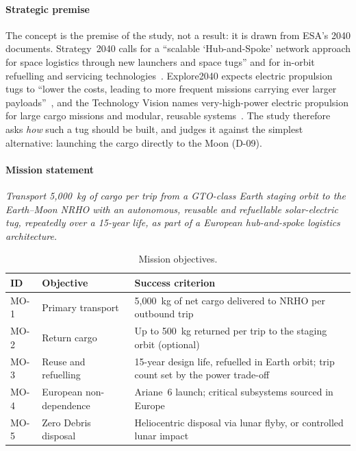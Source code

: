 \documentclass[11pt,a4paper]{article}
\newcommand{\id}[1]{#1}
\begin{document}
\paragraph{Strategic premise} The concept is the premise of the study, not a result: it is drawn from ESA's 2040 documents. Strategy~2040 calls for a ``scalable `Hub-and-Spoke' network approach for space logistics through new launchers and space tugs'' and for in-orbit refuelling and servicing technologies~\cite[p.~45]{strategy2040}. Explore2040 expects electric propulsion tugs to ``lower the costs, leading to more frequent missions carrying ever larger payloads''~\cite[p.~16]{explore2040}, and the Technology Vision names very-high-power electric propulsion for large cargo missions and modular, reusable systems~\cite[pp.~45, 50]{techvision}. The study therefore asks \emph{how} such a tug should be built, and judges it against the simplest alternative: launching the cargo directly to the Moon (\id{D-09}).

\paragraph{Mission statement} \emph{Transport 5,000~kg of cargo per trip from a GTO-class Earth staging orbit to the Earth--Moon NRHO with an autonomous, reusable and refuellable solar-electric tug, repeatedly over a 15-year life, as part of a European hub-and-spoke logistics architecture.}

\begin{table}[htbp]\centering\small
\caption{Mission objectives.}\label{tab:mo}
\begin{tabularx}{\linewidth}{@{}P{1.1cm}P{3.2cm}L@{}}
\toprule
ID & Objective & Success criterion \\
\midrule
\id{MO-1} & Primary transport & 5,000~kg of net cargo delivered to NRHO per outbound trip \\
\id{MO-2} & Return cargo & Up to 500~kg returned per trip to the staging orbit (optional) \\
\id{MO-3} & Reuse and refuelling & 15-year design life, refuelled in Earth orbit; trip count set by the power trade-off \\
\id{MO-4} & European non-dependence & Ariane~6 launch; critical subsystems sourced in Europe \\
\id{MO-5} & Zero Debris disposal & Heliocentric disposal via lunar flyby, or controlled lunar impact \\
\bottomrule
\end{tabularx}
\end{table}
\end{document}
